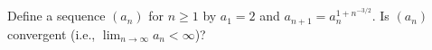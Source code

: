 Define a sequence $(a_n)$ for $n \ge 1$ by $a_1 = 2$ and $a_{n+1} = a_n^{1 +
n^{-3/2}}$. Is $(a_n)$ convergent (i.e., $\displaystyle \lim_{n \to \infty} a_n
< \infty$)?
